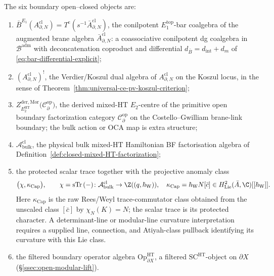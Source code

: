 \begin{defn}
The six boundary open--closed objects are:
\begin{enumerate}[label=\textup{(C\arabic*)}]
  \item \(\bar B^{E_1}(A^{\mathrm{cl}}_{\partial,N})
        =T^{\mathrm{c}}(s^{-1}\bar A^{\mathrm{cl}}_{\partial,N})\),
        the conilpotent \(E_1^{\mathrm{top}}\)-bar coalgebra of the
        augmented brane algebra
        \(\bar A^{\mathrm{cl}}_{\partial,N}\):
        a coassociative conilpotent dg coalgebra in
        \(\mathcal B^{\mathrm{adm}}\) with deconcatenation coproduct and
        differential \(d_{\bar B}=d_{\mathrm{int}}+d_m\)
        of \eqref{eq:bar-differential-explicit};
  \item \((A^{\mathrm{cl}}_{\partial,N})^!\), the Verdier/Koszul
        dual algebra of \(A^{\mathrm{cl}}_{\partial,N}\) on the Koszul
        locus, in the sense of
        Theorem~\ref{thm:universal-ce-pv-koszul-criterion};
  \item \(Z^{\mathrm{der},\mathrm{Mor}}_{E_2^{\mathrm{HT}}}\!\bigl(
        \mathcal C^{\mathrm{op}}_\partial\bigr)\), the derived mixed-HT
        \(E_2\)-centre of the primitive open boundary factorization
        category \(\mathcal C^{\mathrm{op}}_\partial\) on the
        Costello--Gwilliam brane-link boundary; the bulk action or OCA
        map is extra structure;
  \item \(\mathcal A^{\mathrm{cl}}_{\mathrm{bulk}}\), the physical
        bulk mixed-HT Hamiltonian BF factorisation algebra of
        Definition~\ref{def:closed-mixed-HT-factorization};
  \item the protected scalar trace together with the projective anomaly
        class
        \[
          \bigl(\chi,\kappa_{\mathrm{Cap}}\bigr),\qquad
          \chi=\operatorname{sTr}\,(-)\colon
          \mathcal A^{\mathrm{cl}}_{\mathrm{bulk}}\to\Z((q,\hbar_{\mathrm{W}})),
          \quad
          \kappa_{\mathrm{Cap}}=\hbar_{\mathrm{W}}N[\bar c]\in
          H^2_{\mathrm{Lie}}(\bar A,\C)[[\hbar_{\mathrm{W}}]] .
        \]
        Here \(\kappa_{\mathrm{Cap}}\) is the raw Rees/Weyl
        trace-commutator class obtained from the unscaled class
        \([\bar c]\) by \(\chi_N(K)=N\); the scalar trace is its protected
        character.  A determinant-line or modular-line curvature
        interpretation requires a supplied line, connection, and
        Atiyah-class pullback identifying its curvature with this Lie
        class.
  \item the filtered boundary operator algebra
        \(\mathrm{Op}^{\mathrm{HT}}_{\partial X}\), a filtered
        \(\mathrm{SC}^{\mathrm{HT}}\)-object on \(\partial X\)
        (\S\ref{ssec:open-modular-lift}).
\end{enumerate}
\end{defn}

